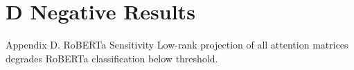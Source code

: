 \section{D Negative Results}

 Appendix D. RoBERTa Sensitivity
Low-rank projection of all attention matrices degrades RoBERTa classification below threshold.
